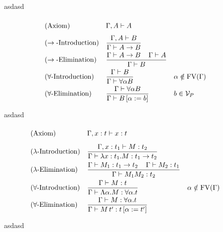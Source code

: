 \begin{frame}{asd}{asd}
\begin{mdframed}
	\begingroup
	\addtolength{\jot}{0.3cm}
	\begin{align*}
		&(\text{Axiom}) &&\Gamma,A\PModels A\vphantom{\frac{\Gamma}{\Gamma}}\\
		&(\rightarrow\text{-Introduction}) &&\frac{\Gamma,A\PModels B}{\Gamma\PModels A\to B}\\
		&(\rightarrow\text{-Elimination}) &&\frac{\Gamma\PModels A\to B \hspace{0.4cm}\Gamma\PModels A}{\Gamma\PModels B}\\ 
		  & (\forall\text{-Introduction}) &   & \frac{\Gamma\PModels B}{\Gamma\PModels \forall\alpha B} &   & \alpha\notin\FV(\Gamma) \\
		&(\forall\text{-Elimination}) &&\frac{\Gamma\PModels \forall\alpha B }{\Gamma\PModels B\left[ \alpha:=b\right] }
		&& b\in\VarP
	\end{align*}
	\endgroup
\end{mdframed}
\end{frame}

\begin{frame}{asd}{asd}
\begin{mdframed} 
	\begingroup
	\addtolength{\jot}{0.3cm}
	\begin{align*}
		&(\text{Axiom}) &&\Gamma,x:t\lambdaModels x:t\vphantom{\frac{t_1}{t_1}}\\
		&(\lambda\text{-Introduction}) &&\frac{\Gamma,x:t_1\lambdaModels M:t_2}{\Gamma\lambdaModels \lambda x:t_1.M:t_1\to t_2}\\
		&(\lambda\text{-Elimination}) &&\frac{\Gamma\lambdaModels M_1:t_1\to t_2 \hspace{0.4cm}\Gamma\lambdaModels M_2:t_1}{\Gamma\lambdaModels M_1M_2:t_2}\\
& (\forall\text{-Introduction}) &   & \frac{\Gamma\lambdaModels M:t}{\Gamma\lambdaModels \Lambda\alpha.M:\forall\alpha.t}                 &   & \alpha\notin\FV(\Gamma) \\
& (\forall\text{-Elimination})  &   & \frac{\Gamma\lambdaModels M:\forall\alpha.t }{\Gamma\lambdaModels M\,t':t\left[ \alpha:=t'\right] } 
	\end{align*}
	\endgroup
\end{mdframed}
\end{frame}

\begin{frame}{asd}{asd}
\begin{figure}
	\centering
	
\end{figure}
\end{frame}